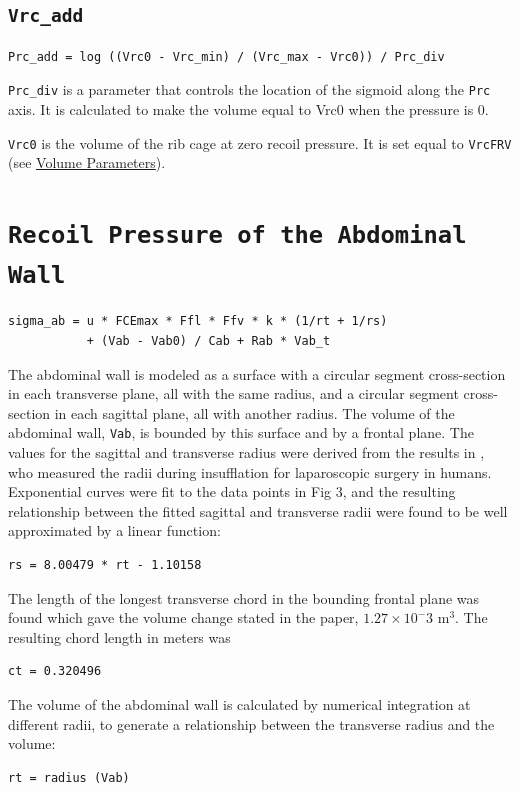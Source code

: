 \documentclass[12pt,openany,oneside]{book}
\begin{document}
\subsection{\texttt{Vrc\_add}}
\begin{verbatim}
Prc_add = log ((Vrc0 - Vrc_min) / (Vrc_max - Vrc0)) / Prc_div
\end{verbatim}
\verb~Prc_div~ is a parameter that controls the location of the
sigmoid along the \verb~Prc~ axis.  It is calculated to make the
volume equal to Vrc0 when the pressure is 0.

\verb~Vrc0~ is the volume of the rib cage at zero recoil pressure.  It
is set equal to \verb~VrcFRV~ (see
\hyperref[Volume Parameters]{Volume Parameters}).

\section{\texttt{Recoil Pressure of the Abdominal Wall}}
\begin{verbatim}
sigma_ab = u * FCEmax * Ffl * Ffv * k * (1/rt + 1/rs)
           + (Vab - Vab0) / Cab + Rab * Vab_t
\end{verbatim}

The abdominal wall is modeled as a surface with a circular segment
cross-section in each transverse plane, all with the same radius, and
a circular segment cross-section in each sagittal plane, all with
another radius.  The volume of the abdominal wall, \verb~Vab~, is
bounded by this surface and by a frontal plane.  The values for the
sagittal and transverse radius were derived from the results in
\citet{Song2006}, who measured the radii during insufflation for
laparoscopic surgery in humans.  Exponential curves were fit to the
data points in Fig 3, and the resulting relationship between the
fitted sagittal and transverse radii were found to be well
approximated by a linear function:
\begin{verbatim}
rs = 8.00479 * rt - 1.10158
\end{verbatim}
The length of the longest transverse chord in the bounding frontal
plane was found which gave the volume change stated in the paper,
$1.27\times 10^-3$ m$^3$.  The resulting chord length in meters was
\begin{verbatim}
ct = 0.320496
\end{verbatim}
The volume of the abdominal wall is calculated by numerical
integration at different radii, to generate a relationship between the
transverse radius and the volume:
\begin{verbatim}
rt = radius (Vab)
\end{verbatim}
\end{document}
